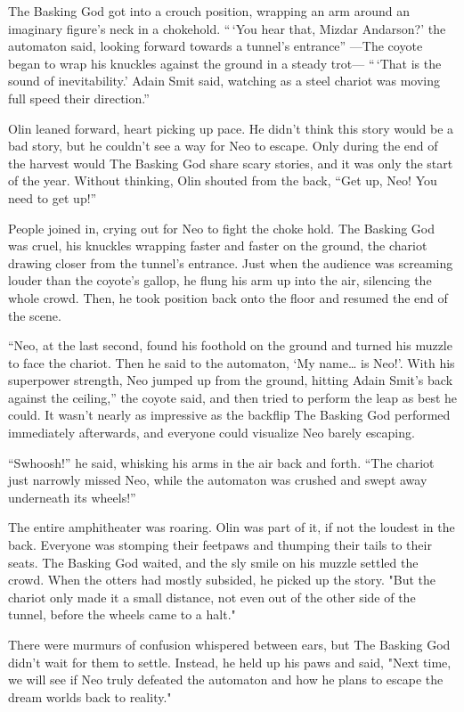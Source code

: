 The Basking God got into a crouch position, wrapping an arm around an imaginary figure's neck in a chokehold. ``\,`You hear that, Mizdar Andarson?' the automaton said, looking forward towards a tunnel's entrance'' ---The coyote began to wrap his knuckles against the ground in a steady trot--- ``\,`That is the sound of inevitability.' Adain Smit said, watching as a steel chariot was moving full speed their direction.''

Olin leaned forward, heart picking up pace. He didn't think this story would be a bad story, but he couldn't see a way for Neo to escape. Only during the end of the harvest would The Basking God share scary stories, and it was only the start of the year. Without thinking, Olin shouted from the back, ``Get up, Neo! You need to get up!''

People joined in, crying out for Neo to fight the choke hold. The Basking God was cruel, his knuckles wrapping faster and faster on the ground, the chariot drawing closer from the tunnel's entrance. Just when the audience was screaming louder than the coyote's gallop, he flung his arm up into the air, silencing the whole crowd. Then, he took position back onto the floor and resumed the end of the scene.

``Neo, at the last second, found his foothold on the ground and turned his muzzle to face the chariot. Then he said to the automaton, `My name\ldots{} is Neo!'. With his superpower strength, Neo jumped up from the ground, hitting Adain Smit's back against the ceiling,'' the coyote said, and then tried to perform the leap as best he could. It wasn't nearly as impressive as the backflip The Basking God performed immediately afterwards, and everyone could visualize Neo barely escaping.

``Swhoosh!'' he said, whisking his arms in the air back and forth. ``The chariot just narrowly missed Neo, while the automaton was crushed and swept away underneath its wheels!''

The entire amphitheater was roaring. Olin was part of it, if not the loudest in the back. Everyone was stomping their feetpaws and thumping their tails to their seats. The Basking God waited, and the sly smile on his muzzle settled the crowd. When the otters had mostly subsided, he picked up the story. "But the chariot only made it a small distance, not even out of the other side of the tunnel, before the wheels came to a halt."

There were murmurs of confusion whispered between ears, but The Basking God didn't wait for them to settle. Instead, he held up his paws and said, "Next time, we will see if Neo truly defeated the automaton and how he plans to escape the dream worlds back to reality."

